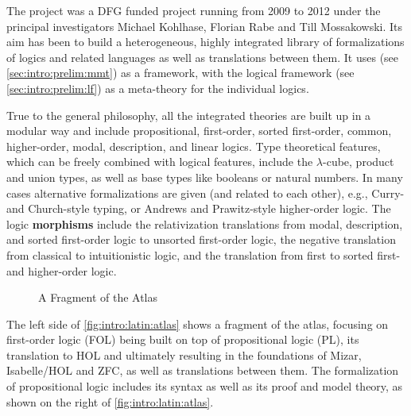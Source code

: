 The \latin project \cite{CHKMR:latinabs:11} was a DFG funded project running from 2009 to 2012 under the principal investigators Michael Kohlhase, Florian Rabe and Till Mossakowski. Its aim has been to build a heterogeneous, highly integrated  library of formalizations of logics and related languages as well as translations between them.
It uses \mmt (see \autoref{sec:intro:prelim:mmt}) as a framework, with the logical framework \LF (see \autoref{sec:intro:prelim:lf}) as a meta-theory for the individual logics.

True to the general \mmt philosophy, all the integrated theories are built up in a modular way and include propositional, first-order, sorted
first-order, common, higher-order, modal, description, and linear logics.  Type
theoretical features, which can be freely combined with logical features, include the
$\lambda$-cube, product and union types, as well as base types like booleans or natural
numbers.  In many cases alternative formalizations are given (and related to each other),
e.g., Curry- and Church-style typing, or Andrews and Prawitz-style higher-order logic.
The logic \textbf{morphisms} include the relativization translations from modal,
description, and sorted first-order logic to unsorted first-order logic,
the negative translation from classical to intuitionistic logic, and the translation from first to sorted first- and higher-order logic.


\begin{figure}[ht]
\begin{center}
\end{center}
\caption{A Fragment of the \latin Atlas}\label{fig:intro:latin:atlas}
\end{figure}

The left side of \autoref{fig:intro:latin:atlas} shows a fragment of the \latin atlas, focusing on first-order logic (FOL) being built on top of propositional logic (PL), its translation to HOL and ultimately resulting in the foundations of Mizar, Isabelle/HOL and ZFC, as well as translations between them. The formalization of propositional logic includes its syntax as well as its proof and model theory, as shown on the right of \autoref{fig:intro:latin:atlas}.
